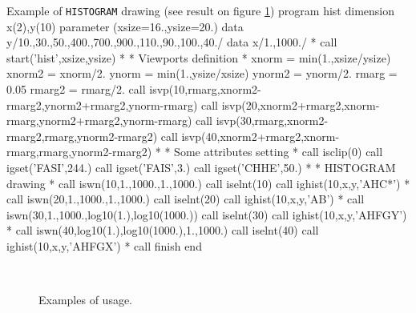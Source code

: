 \begin{minipage}{\textwidth}
\begin{XMPt}{Example of {\tt HISTOGRAM} drawing (see result on figure 
\ref{HIST})}
      program hist 
      dimension x(2),y(10)
      parameter (xsize=16.,ysize=20.)
      data y/10.,30.,50.,400.,700.,900.,110.,90.,100.,40./
      data x/1.,1000./
*
      call start('hist',xsize,ysize)
*
*              Viewports definition
*
      xnorm  = min(1.,xsize/ysize)
      xnorm2 = xnorm/2.
      ynorm  = min(1.,ysize/xsize)
      ynorm2 = ynorm/2.
      rmarg  = 0.05
      rmarg2 = rmarg/2.
      call isvp(10,rmarg,xnorm2-rmarg2,ynorm2+rmarg2,ynorm-rmarg)
      call isvp(20,xnorm2+rmarg2,xnorm-rmarg,ynorm2+rmarg2,ynorm-rmarg)
      call isvp(30,rmarg,xnorm2-rmarg2,rmarg,ynorm2-rmarg2)
      call isvp(40,xnorm2+rmarg2,xnorm-rmarg,rmarg,ynorm2-rmarg2)
*
*              Some attributes setting
*
      call isclip(0)
      call igset('FASI',244.)
      call igset('FAIS',3.)
      call igset('CHHE',50.)
*
*              HISTOGRAM drawing
*
      call iswn(10,1.,1000.,1.,1000.)
      call iselnt(10)
      call ighist(10,x,y,'AHC*')
*
      call iswn(20,1.,1000.,1.,1000.)
      call iselnt(20)
      call ighist(10,x,y,'AB')
*
      call iswn(30,1.,1000.,log10(1.),log10(1000.))
      call iselnt(30)
      call ighist(10,x,y,'AHFGY')
*
      call iswn(40,log10(1.),log10(1000.),1.,1000.)
      call iselnt(40)
      call ighist(10,x,y,'AHFGX')
*
      call finish
      end
\end{XMPt}
\end{minipage}

\begin{figure}[p]
\begin{center}
\mbox{}\\[-15mm]
\mbox{}
\end{center}
\caption{Examples of \protect{} usage.}
\label{HIST}
\end{figure}

\clearpage
 
